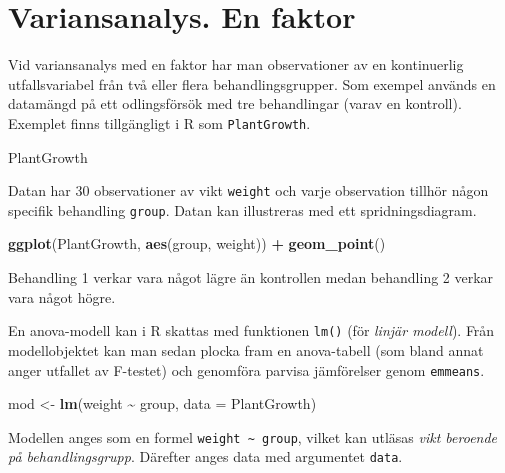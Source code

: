 \documentclass[
]{book}
\newenvironment{Shaded}{\begin{snugshade}}{\end{snugshade}}
\newcommand{\AttributeTok}[1]{\textcolor[rgb]{0.13,0.29,0.53}{#1}}
\newcommand{\FunctionTok}[1]{\textcolor[rgb]{0.13,0.29,0.53}{\textbf{#1}}}
\newcommand{\NormalTok}[1]{#1}
\newcommand{\OtherTok}[1]{\textcolor[rgb]{0.56,0.35,0.01}{#1}}
\newcommand{\SpecialCharTok}[1]{\textcolor[rgb]{0.81,0.36,0.00}{\textbf{#1}}}
\theoremstyle{definition}
\theoremstyle{definition}
\theoremstyle{definition}
\theoremstyle{definition}
\theoremstyle{remark}
\begin{document}
\section{Variansanalys. En faktor}\label{variansanalys.-en-faktor}

Vid variansanalys med en faktor har man observationer av en kontinuerlig utfallsvariabel från två eller flera behandlingsgrupper. Som exempel används en datamängd på ett odlingsförsök med tre behandlingar (varav en kontroll). Exemplet finns tillgängligt i R som \texttt{PlantGrowth}.

\begin{Shaded}
\begin{Highlighting}[]
\NormalTok{PlantGrowth}
\end{Highlighting}
\end{Shaded}

Datan har 30 observationer av vikt \texttt{weight} och varje observation tillhör någon specifik behandling \texttt{group}. Datan kan illustreras med ett spridningsdiagram.

\begin{Shaded}
\begin{Highlighting}[]
\FunctionTok{ggplot}\NormalTok{(PlantGrowth, }\FunctionTok{aes}\NormalTok{(group, weight)) }\SpecialCharTok{+}
  \FunctionTok{geom\_point}\NormalTok{()}
\end{Highlighting}
\end{Shaded}

Behandling 1 verkar vara något lägre än kontrollen medan behandling 2 verkar vara något högre.

En anova-modell kan i R skattas med funktionen \texttt{lm()} (för \emph{linjär modell}). Från modellobjektet kan man sedan plocka fram en anova-tabell (som bland annat anger utfallet av F-testet) och genomföra parvisa jämförelser genom \texttt{emmeans}.

\begin{Shaded}
\begin{Highlighting}[]
\NormalTok{mod }\OtherTok{\textless{}{-}} \FunctionTok{lm}\NormalTok{(weight }\SpecialCharTok{\textasciitilde{}}\NormalTok{ group, }\AttributeTok{data =}\NormalTok{ PlantGrowth)}
\end{Highlighting}
\end{Shaded}

Modellen anges som en formel \texttt{weight\ \textasciitilde{}\ group}, vilket kan utläsas \emph{vikt beroende på behandlingsgrupp}. Därefter anges data med argumentet \texttt{data}.
\end{document}
